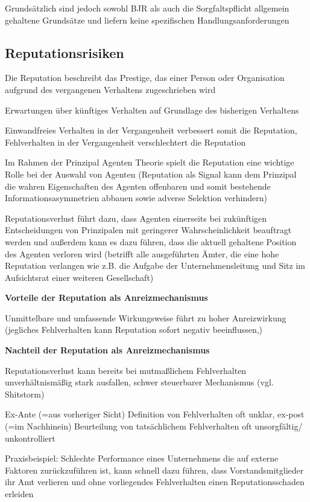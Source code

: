 \documentclass[
]{article}
\begin{document}
Grundsätzlich sind jedoch sowohl BJR als auch die Sorgfaltspflicht
allgemein gehaltene Grundsätze und liefern keine spezifischen
Handlungsanforderungen

\hypertarget{reputationsrisiken}{%
\subsection{Reputationsrisiken}\label{reputationsrisiken}}

Die Reputation beschreibt das Prestige, das einer Person oder
Organisation aufgrund des vergangenen Verhaltens zugeschrieben wird

Erwartungen über künftiges Verhalten auf Grundlage des bisherigen
Verhaltens

Einwandfreies Verhalten in der Vergangenheit verbessert somit die
Reputation, Fehlverhalten in der Vergangenheit verschlechtert die
Reputation

Im Rahmen der Prinzipal Agenten Theorie spielt die Reputation eine
wichtige Rolle bei der Auswahl von Agenten (Reputation als Signal kann
dem Prinzipal die wahren Eigenschaften des Agenten offenbaren und somit
bestehende Informationsasymmetrien abbauen sowie adverse Selektion
verhindern)

Reputationsverlust führt dazu, dass Agenten einerseits bei zukünftigen
Entscheidungen von Prinzipalen mit geringerer Wahrscheinlichkeit
beauftragt werden und außerdem kann es dazu führen, dass die aktuell
gehaltene Position des Agenten verloren wird (betrifft alle ausgeführten
Ämter, die eine hohe Reputation verlangen wie z.B. die Aufgabe der
Unternehmensleitung und Sitz im Aufsichtsrat einer weiteren
Gesellschaft)

\textbf{Vorteile der Reputation als Anreizmechanismus }

Unmittelbare und umfassende Wirkungsweise führt zu hoher Anreizwirkung
(jegliches Fehlverhalten kann Reputation sofort negativ beeinflussen,)

\textbf{Nachteil der Reputation als Anreizmechanismus}

Reputationsverlust kann bereits bei mutmaßlichem Fehlverhalten
unverhältnismäßig stark ausfallen, schwer steuerbarer Mechanismus (vgl.
Shitstorm)

Ex-Ante (=aus vorheriger Sicht) Definition von Fehlverhalten oft unklar,
ex-post (=im Nachhinein) Beurteilung von tatsächlichem Fehlverhalten oft
unsorgfältig/ unkontrolliert

Praxisbeispiel: Schlechte Performance eines Unternehmens die auf externe
Faktoren zurückzuführen ist, kann schnell dazu führen, dass
Vorstandsmitglieder ihr Amt verlieren und ohne vorliegendes
Fehlverhalten einen Reputationsschaden erleiden
\end{document}

